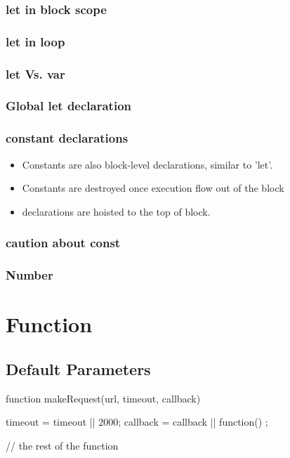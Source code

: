 \subsubsection{let in block scope}

\subsubsection{let in loop}

\subsubsection{let Vs. var}

\subsubsection{Global let declaration}

\subsubsection{constant declarations}
\begin{itemize}
\item Constants are also block-level declarations, similar to 'let'.
\item Constants are destroyed once execution flow out of the block
\item declarations are hoisted to the top of block.
\end{itemize}

\subsubsection{caution about const}

\subsubsection{Number}


\section{Function}


\subsection{Default Parameters}

\begin{JavaScript}
function makeRequest(url, timeout, callback) {

    timeout = timeout || 2000;
    callback = callback || function() {};

    // the rest of the function

}
\end{JavaScript}

